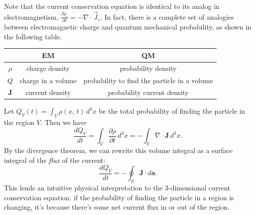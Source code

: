 \begin{framedrmk*}
  Note that the current conservation equation is identical to its analog in electromagnetism, $\frac{\partial\rho_c}{\partial t}=-\nabla\cdot \vec{J}_c$. In fact, there is a complete set of analogies between electromagnetic charge and quantum mechanical probability, as shown in the following table.

    \centering
  \begin{tabular}{|c|c|c|}
      \hline
      & \textbf{EM} & \textbf{QM} \\
      \hline
      $\rho$ & charge density & probability density \\
      $Q$ & charge in a volume & probability to find the particle in a volume \\
      $\mathbf{J}$ & current density & probability current density \\
      \hline
  \end{tabular}

\end{framedrmk*}

Let $Q_V(t)=\int_V\rho(x,\,t)\,d^3x$ be the total probability of finding the particle in the region $V$. Then we have $$\frac{dQ_V}{dt}=\int_V\frac{\partial\rho}{\partial t}\,d^3x=-\int_V\nabla\cdot\mathbf{J}\,d^3x.$$By the divergence theorem, we can rewrite this volume integral as a surface integral of the \textit{flux} of the current: $$\frac{dQ_V}{dt}=-\oint_S\mathbf{J}\cdot d\mathbf{a}.$$This lends an intuitive physical interpretation to the 3-dimensional current conservation equation: if the probability of finding the particle in a region is changing, it's because there's some net current flux in or out of the region.
